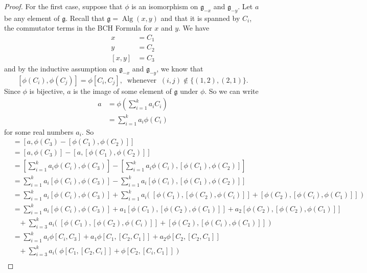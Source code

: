 \documentclass[honours]{UNSWthesis}
\newcommand{\g}{\mathfrak{g}}
\newcommand{\1}{\mathbf{e}_{1}}
\newcommand{\2}{\mathbf{e}_{3}}
\newcommand{\3}{\mathbf{e}_{3}}
\DeclareMathOperator{\alg}{Alg}
\begin{document}
\begin{proof}
For the first case, suppose that $\phi$ is an isomorphism on $\g_{-x}$ and $\g_{-y}$. \newline
Let $a$ be any element of $\g$. Recall that $\g = \alg(x,y)$ and that it is spanned by $C_{i}$, the commutator terms in the BCH Formula for $x$ and $y$. We have 
\begin{align*}
x&=C_{1}\\
y&=C_{2}\\
[x,y]&=C_{3}
\end{align*}
and by the inductive assumption on $\g_{-x}$ and $\g_{-y}$, we know that 
\[
[\phi(C_{i}),\phi(C_{j})]=\phi[C_{i},C_{j}],\;\;\text{whenever}\;\; (i,j) \notin \{(1,2),(2,1)\}.
\]
Since $\phi$ is bijective, $a$ is the image of some element of $\g$ under $\phi$. So we can write 
\begin{align*}
a &=\phi\left(\sum\limits_{i=1}^{k}a_{i}C_{i}\right)\\
&=\sum\limits_{i=1}^{k} a_{i}\phi(C_{i})
\end{align*}
for some real numbers $a_{i}$.\newline
So
\begin{align*}
[a,z] &= [a,\phi(C_{3})-[\phi(C_{1}),\phi(C_{2})]] \\
&=[a,\phi(C_{3})]-[a,[\phi(C_{1}),\phi(C_{2})]] \\
&=\left[\sum\limits_{i=1}^{k} a_{i}\phi(C_{i}),\phi(C_{3}) \right]-\left[ \sum\limits_{i=1}^{k} a_{i}\phi(C_{i}),[\phi(C_{1}),\phi(C_{2})]\right] \\
&=\sum\limits_{i=1}^{k} a_{i}[\phi(C_{i}),\phi(C_{3})]-\sum\limits_{i=1}^{k} a_{i}[\phi(C_{i}),[\phi(C_{1}),\phi(C_{2})]] \\
&=\sum\limits_{i=1}^{k} a_{i}[\phi(C_{i}),\phi(C_{3})]+ \sum\limits_{i=1}^{k} a_{i}\big(\; [\phi(C_{1}),[\phi(C_{2}),\phi(C_{i})]]+[\phi(C_{2}),[\phi(C_{i}),\phi(C_{1})]]\;\big) \\
&=\sum\limits_{i=1}^{k} a_{i}[\phi(C_{i}),\phi(C_{3})]+a_{1}[\phi(C_{1}),[\phi(C_{2}),\phi(C_{1})]]+a_{2}[\phi(C_{2}),[\phi(C_{2}),\phi(C_{1})]] \\
&\;\;\;+ \sum\limits_{i=3}^{k} a_{i}\big(\; [\phi(C_{1}),[\phi(C_{2}),\phi(C_{i})]]+[\phi(C_{2}),[\phi(C_{i}),\phi(C_{1})]] \;\big) \\
&=\sum\limits_{i=1}^{k} a_{i}\phi[C_{i},C_{3}]+a_{1}\phi[C_{1},[C_{2},C_{1}]]+a_{2}\phi[C_{2},[C_{2},C_{1}]] \\
&\;\;\;+ \sum\limits_{i=3}^{k} a_{i}\big(\; \phi[C_{1},[C_{2},C_{i}]]+\phi[C_{2},[C_{i},C_{1}]] \;\big) \\

\end{align*}
\end{proof}
\end{document}

